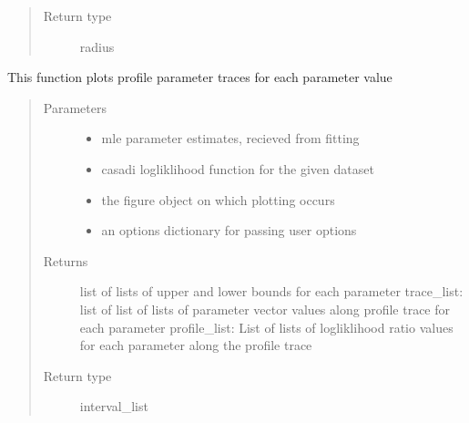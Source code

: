 \documentclass[letterpaper,10pt,english]{sphinxmanual}
\begin{document}
\begin{fulllineitems}
\begin{fulllineitems}
\begin{quote}
\begin{description}
\item[{Return type}] \leavevmode
radius

\end{description}\end{quote}

\end{fulllineitems}


\begin{fulllineitems}
\label{\detokenize{nloed:nloed.model.Model.__profileplot}}
This function plots profile parameter traces for each parameter value
\begin{quote}\begin{description}
\item[{Parameters}] \leavevmode\begin{itemize}
\item {} 
 \textendash{} mle parameter estimates,  recieved from fitting

\item {} 
 \textendash{} casadi logliklihood function for the given dataset

\item {} 
 \textendash{} the figure object on which plotting occurs

\item {} 
 \textendash{} an options dictionary for passing user options

\end{itemize}

\item[{Returns}] \leavevmode
list of lists of upper and lower bounds for each parameter
trace\_list: list of list of lists of parameter vector values along profile trace for each parameter
profile\_list: List of lists of logliklihood ratio values for each parameter along the profile trace

\item[{Return type}] \leavevmode
interval\_list

\end{description}\end{quote}


\end{fulllineitems}
\end{fulllineitems}
\end{document}
